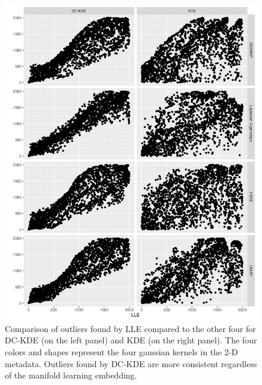 \documentclass[12pt]{article}
\begin{document}
\begin{figure}

{\centering \includegraphics[width=0.9\linewidth]{figures/Twin Peak2000_density_compare_llevs4ml_radius8_r0_5_rank} 

}

\caption{Comparison of outliers found by LLE compared to the other four for DC-KDE (on the left panel) and KDE (on the right panel). The four colors and shapes represent the four gaussian kernels in the 2-D metadata. Outliers found by DC-KDE are more consistent regardless of the manifold learning embedding.}\label{fig:tpllevs4ml}
\end{figure}
\end{document}
